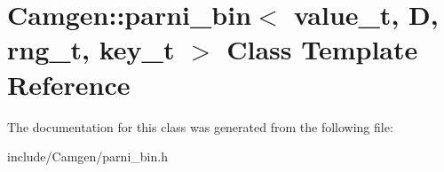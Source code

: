 \hypertarget{a00386}{\section{Camgen\-:\-:parni\-\_\-bin$<$ value\-\_\-t, D, rng\-\_\-t, key\-\_\-t $>$ Class Template Reference}
\label{a00386}
}


The documentation for this class was generated from the following file\-:\begin{DoxyCompactItemize}
\item 
include/\-Camgen/parni\-\_\-bin.\-h\end{DoxyCompactItemize}

